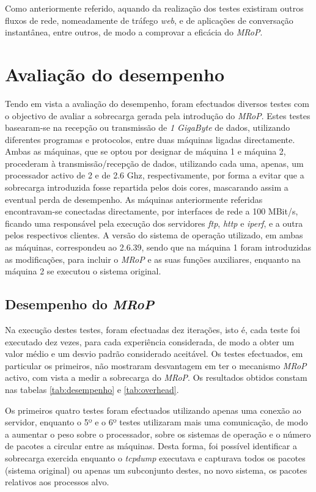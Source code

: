 Como anteriormente referido, aquando da realização dos testes existiram outros fluxos de rede, nomeadamente de tráfego \textit{web}, e de aplicações de conversação instantânea, entre outros, de modo a comprovar a eficácia do \textit{MRoP}.

\section{Avaliação do desempenho}
\label{sec:eval_performance}

Tendo em vista a avaliação do desempenho, foram efectuados diversos testes com o objectivo de avaliar a sobrecarga gerada pela introdução do \textit{MRoP}.
Estes testes basearam-se na recepção ou transmissão de \textit{1 GigaByte} de dados, utilizando diferentes programas e protocolos, entre duas máquinas ligadas directamente.
Ambas as máquinas, que se optou por designar de máquina 1 e máquina 2, procederam à transmissão/recepção de dados, utilizando cada uma, apenas, um processador activo de 2 e de 2.6 Ghz, respectivamente, por forma a evitar que a sobrecarga introduzida fosse repartida pelos dois cores, mascarando assim a eventual perda de desempenho.
As máquinas anteriormente referidas encontravam-se conectadas directamente, por interfaces de rede a 100 MBit/s, ficando uma responsável pela execução dos servidores \textit{ftp}, \textit{http} e \textit{iperf}, e a outra pelos respectivos clientes.
A versão do sistema de operação utilizado, em ambas as máquinas, correspondeu ao 2.6.39, sendo que na máquina 1 foram introduzidas as modificações, para incluir o \textit{MRoP} e as suas funções auxiliares, enquanto na máquina 2 se executou o sistema original.

\subsection{Desempenho do \textit{MRoP}}


Na execução destes testes, foram efectuadas dez iterações, isto é, cada teste foi executado dez vezes, para cada experiência considerada, de modo a obter um valor médio e um desvio padrão considerado aceitável.
Os testes efectuados, em particular os primeiros, não mostraram desvantagem em ter o mecanismo \textit{MRoP} activo, com vista a medir a sobrecarga do \textit{MRoP}.
Os resultados obtidos constam nas tabelas \ref{tab:desempenho} e \ref{tab:overhead}.

Os primeiros quatro testes foram efectuados utilizando apenas uma conexão ao servidor, enquanto o 5º e o 6º testes utilizaram mais uma comunicação, de modo a aumentar o peso sobre o processador, sobre os sistemas de operação e o número de pacotes a circular entre as máquinas.
Desta forma, foi possível identificar a sobrecarga exercida enquanto o \textit{tcpdump} executava e capturava todos os pacotes (sistema original) ou apenas um subconjunto destes, no novo sistema, os pacotes relativos aos processos alvo.

